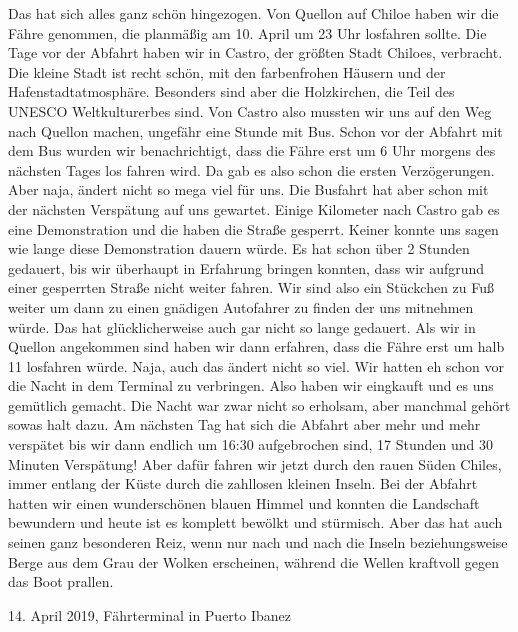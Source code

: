 \documentclass[11pt]{book}
\begin{document}
Das hat sich alles ganz schön hingezogen. Von Quellon auf Chiloe haben wir die Fähre genommen, die planmäßig am 10. April um 23 
Uhr losfahren sollte. Die Tage vor der Abfahrt haben wir in Castro, der größten Stadt Chiloes, verbracht. Die kleine Stadt ist recht 
schön, mit den farbenfrohen Häusern und der Hafenstadtatmosphäre. Besonders sind aber die Holzkirchen, die Teil des UNESCO Weltkulturerbes 
sind. Von Castro also mussten wir uns auf den Weg nach Quellon machen, ungefähr eine Stunde mit Bus. Schon vor der Abfahrt mit dem 
Bus wurden wir benachrichtigt, dass die Fähre erst um 6 Uhr morgens des nächsten Tages los fahren wird. Da gab es also schon die 
ersten Verzögerungen. Aber naja, ändert nicht so mega viel für uns. Die Busfahrt hat aber schon mit der nächsten Verspätung auf 
uns gewartet. Einige Kilometer nach Castro gab es eine Demonstration und die haben die Straße gesperrt. Keiner konnte uns sagen 
wie lange diese Demonstration dauern würde. Es hat schon über 2 Stunden gedauert, bis wir überhaupt in Erfahrung bringen konnten, 
dass wir aufgrund einer gesperrten Straße nicht weiter fahren. Wir sind also ein Stückchen zu Fuß weiter um dann zu einen gnädigen 
Autofahrer zu finden der uns mitnehmen würde. Das hat glücklicherweise auch gar nicht so lange gedauert. Als wir in Quellon angekommen 
sind haben wir dann erfahren, dass die Fähre erst um halb 11 losfahren würde. Naja, auch das ändert nicht so viel. Wir hatten eh 
schon vor die Nacht in dem Terminal zu verbringen. Also haben wir eingkauft und es uns gemütlich gemacht. Die Nacht war zwar nicht 
so erholsam, aber manchmal gehört sowas halt dazu. Am nächsten Tag hat sich die Abfahrt aber mehr und mehr verspätet bis wir dann 
endlich um 16:30 aufgebrochen sind, 17 Stunden und 30 Minuten Verspätung! Aber dafür fahren wir jetzt durch den rauen Süden Chiles, 
immer entlang der Küste durch die zahllosen kleinen Inseln. Bei der Abfahrt hatten wir einen wunderschönen blauen Himmel und konnten 
die Landschaft bewundern und heute ist es komplett bewölkt und stürmisch. Aber das hat auch seinen ganz besonderen Reiz, wenn nur nach und 
nach die Inseln beziehungsweise Berge aus dem Grau der Wolken erscheinen, während die Wellen kraftvoll gegen das Boot prallen. 

14. April 2019, Fährterminal in Puerto Ibanez
\end{document}
